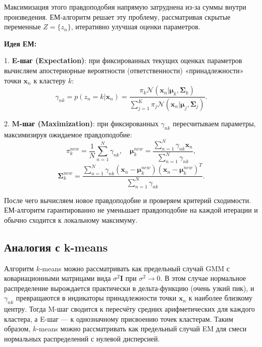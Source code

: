 Максимизация этого правдоподобия напрямую затруднена из-за суммы внутри произведения. ЕМ-алгоритм решает эту проблему, рассматривая скрытые переменные $Z=\{z_n\}$, итеративно улучшая оценки параметров.

\textbf{Идея ЕМ:} 

1. \textbf{E-шаг (Expectation)}: при фиксированных текущих оценках параметров вычисляем апостериорные вероятности (ответственности) «принадлежности» точки $\mathbf{x}_n$ к кластеру $k$:
\begin{equation*}
\gamma_{nk} = p(z_n = k|\mathbf{x}_n) = \frac{\pi_k \mathcal{N}(\mathbf{x}_n|\boldsymbol{\mu}_k,\boldsymbol{\Sigma}_k)}{\sum_{j=1}^K \pi_j \mathcal{N}(\mathbf{x}_n|\boldsymbol{\mu}_j,\boldsymbol{\Sigma}_j)}.
\end{equation*}

2. \textbf{M-шаг (Maximization)}: при фиксированных $\gamma_{nk}$ пересчитываем параметры, максимизируя ожидаемое правдоподобие:
\begin{equation*}
\pi_k^{new} = \frac{1}{N}\sum_{n=1}^N \gamma_{nk}, \quad \boldsymbol{\mu}_k^{new} = \frac{\sum_{n=1}^N \gamma_{nk}\mathbf{x}_n}{\sum_{n=1}^N \gamma_{nk}},
\end{equation*}
\begin{equation*}
\boldsymbol{\Sigma}_k^{new} = \frac{\sum_{n=1}^N \gamma_{nk}(\mathbf{x}_n - \boldsymbol{\mu}_k^{new})(\mathbf{x}_n - \boldsymbol{\mu}_k^{new})^T}{\sum_{n=1}^N \gamma_{nk}}.
\end{equation*}

После чего вычисляем новое правдоподобие и проверяем критерий сходимости. ЕМ-алгоритм гарантированно не уменьшает правдоподобие на каждой итерации и обычно сходится к локальному максимуму.

\subsection{Аналогия с k-means}

Алгоритм $k$-means можно рассматривать как предельный случай GMM с ковариационными матрицами вида $\sigma^2 \mathbf{I}$ при $\sigma^2 \to 0$. В этом случае нормальное распределение вырождается практически в дельта-функцию (очень узкий пик), и $\gamma_{nk}$ превращаются в индикаторы принадлежности точки $\mathbf{x}_n$ к наиболее близкому центру. Тогда M-шаг сводится к пересчёту средних арифметических для каждого кластера, а E-шаг --- к однозначному присвоению точек кластерам. Таким образом, $k$-means можно рассматривать как предельный случай EM для смеси нормальных распределений с нулевой дисперсией.

